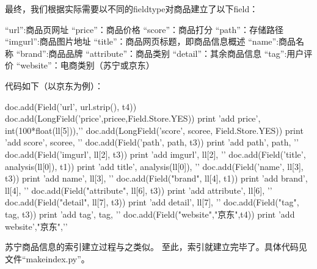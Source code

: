 最终，我们根据实际需要以不同的fieldtype对商品建立了以下field：

	“url”:商品页网址
	“price”：商品价格
	“score”：商品打分
	“path”：存储路径
	“imgurl”:商品图片地址
	“title”：商品网页标题，即商品信息概述
	“name”:商品名称
	“brand”:商品品牌
	“attribute”：商品类别
	“detail”：其余商品信息
	“tag”:用户评价
	“website”：电商类别（苏宁或京东）

代码如下（以京东为例）：

\begin{python}
                                doc.add(Field('url', url.strip(), t4))
                                doc.add(LongField('price',pricee,Field.Store.YES))
                                print 'add price', int(100*float(ll[5])),'\n'
                                doc.add(LongField('score', scoree, Field.Store.YES))
                                print 'add score', scoree, '\n'
                                doc.add(Field('path', path, t3))
                                print 'add path', path, '\n'
                                doc.add(Field('imgurl', ll[2], t3))
                                print 'add imgurl', ll[2], '\n'
                                doc.add(Field('title', analysis(ll[0]), t1))
                                print 'add title', analysis(ll[0]), '\n'
                                doc.add(Field('name', ll[3], t3))
                                print 'add name', ll[3], '\n'
                                doc.add(Field("brand", ll[4], t1))
                                print 'add brand', ll[4], '\n'
                                doc.add(Field("attribute", ll[6], t3))
                                print 'add attribute', ll[6], '\n'
                                doc.add(Field("detail", ll[7], t3))
                                print 'add detail', ll[7], '\n'
                                doc.add(Field("tag", tag, t3))
                                print 'add tag', tag, '\n'
                                doc.add(Field("website","京东",t4))
                                print 'add website',"京东",'\n'
\end{python}

苏宁商品信息的索引建立过程与之类似。
至此，索引就建立完毕了。具体代码见文件“makeindex.py”。
